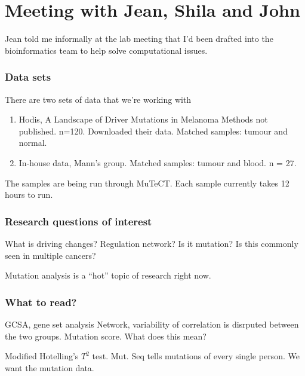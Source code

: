 \documentclass{amsart}
\begin{document}
\part{Meeting with Jean, Shila and John}
Jean told me informally at the lab meeting that I'd been drafted into the bioinformatics team
to help solve computational issues.

\section{Data sets}
There are two sets of data that we're working with
\begin{enumerate}
\item Hodis, A Landscape of Driver Mutations in Melanoma
Methods not published. n=120. Downloaded their data. Matched samples: tumour and normal.
\item In-house data, Mann's group.
Matched samples: tumour and blood. n = 27.
\end{enumerate}

The samples are being run through MuTeCT. Each sample currently takes 12 hours to run.

\section{Research questions of interest}
What is driving changes? Regulation network? Is it mutation? Is this commonly seen in
multiple cancers?

Mutation analysis is a ``hot'' topic of research right now.

\section{What to read?}
GCSA, gene set analysis
Network, variability of correlation is disrputed between the two groups.
Mutation score. What does this mean?

Modified Hotelling's $T^2$ test.
Mut. Seq tells mutations of every single person.
We want the mutation data.
\end{document}
